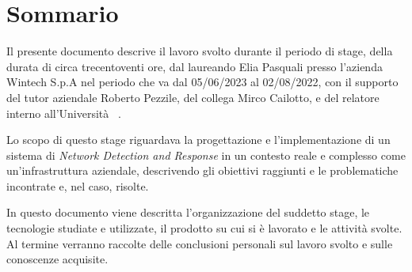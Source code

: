\cleardoublepage
{}
{}
\begingroup
\let\clearpage\relax
\let\cleardoublepage\relax
\let\cleardoublepage\relax

\chapter*{Sommario}

Il presente documento descrive il lavoro svolto durante il periodo di stage, della durata di circa trecentoventi ore, dal laureando Elia Pasquali presso l'azienda Wintech S.p.A nel periodo che va dal 05/06/2023 al 02/08/2022, con il supporto del tutor aziendale Roberto Pezzile, del collega Mirco Cailotto, e del relatore interno all'Università \profTitle\ \myProf.

\medskip

Lo scopo di questo stage riguardava la progettazione e l'implementazione di un sistema di \emph{Network Detection and Response} in un contesto reale e complesso come un'infrastruttura aziendale, descrivendo gli obiettivi raggiunti e le problematiche incontrate e, nel caso, risolte.

\medskip

In questo documento viene descritta l'organizzazione del suddetto stage, le tecnologie studiate e utilizzate, il prodotto su cui si è lavorato e le attività svolte. Al termine verranno raccolte delle conclusioni personali sul lavoro svolto e sulle conoscenze acquisite.

\endgroup

\vfill
